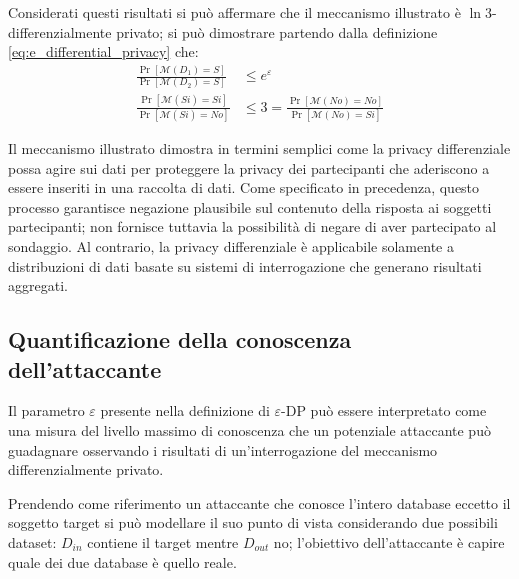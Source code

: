 Considerati questi risultati si può affermare che il meccanismo illustrato è $\ln{3}$-differenzialmente privato; si può dimostrare partendo dalla definizione \eqref{eq:e_differential_privacy} che:
\begin{align*}
    \frac{\Pr[\mathcal{M}(D_1) = S]}{\Pr[\mathcal{M}(D_2) = S]
    } &\le e^{\varepsilon}\\
    \frac{\Pr[\mathcal{M}(Si) = Si]}{\Pr[\mathcal{M}(Si) = No]} &\le 3 = \frac{\Pr[\mathcal{M}(No) = No]}{\Pr[\mathcal{M}(No) = Si]}
\end{align*}

Il meccanismo illustrato dimostra in termini semplici come la privacy differenziale possa agire sui dati per proteggere la privacy dei partecipanti che aderiscono a essere inseriti in una raccolta di dati. Come specificato in precedenza, questo processo garantisce negazione plausibile sul contenuto della risposta ai soggetti partecipanti; non fornisce tuttavia la possibilità di negare di aver partecipato al sondaggio. Al contrario, la privacy differenziale è applicabile solamente a distribuzioni di dati basate su sistemi di interrogazione che generano risultati aggregati.

\subsection{Quantificazione della conoscenza dell'attaccante}
Il parametro $\varepsilon$ presente nella definizione di $\varepsilon$-DP può essere interpretato come una misura del livello massimo di conoscenza che un potenziale attaccante può guadagnare osservando i risultati di un'interrogazione del meccanismo differenzialmente privato.

Prendendo come riferimento un attaccante che conosce l'intero database eccetto il soggetto target si può modellare il suo punto di vista considerando due possibili dataset: $D_{in}$ contiene il target mentre $D_{out}$ no; l'obiettivo dell'attaccante è capire quale dei due database è quello reale.

